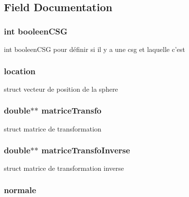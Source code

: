 \subsection{Field Documentation}
\hypertarget{structsphere_a4428e32d4383f7dee25e5a4cb192da24}{
\subsubsection[{booleenCSG}]{\setlength{\rightskip}{0pt plus 5cm}int {\bf booleenCSG}}}
\label{structsphere_a4428e32d4383f7dee25e5a4cb192da24}
int booleenCSG pour définir si il y a une csg et laquelle c'est \hypertarget{structsphere_ae655d799d0a983ee8cf5fc840953c404}{
\subsubsection[{location}]{ {\bf location}}}
\label{structsphere_ae655d799d0a983ee8cf5fc840953c404}
struct vecteur de position de la sphere \hypertarget{structsphere_aa06ccc348007e3355beccf412f2f656c}{
\subsubsection[{matriceTransfo}]{\setlength{\rightskip}{0pt plus 5cm}double$\ast$$\ast$ {\bf matriceTransfo}}}
\label{structsphere_aa06ccc348007e3355beccf412f2f656c}
struct matrice de transformation \hypertarget{structsphere_acd7a3590501dcccfaefccbb658f83821}{
\subsubsection[{matriceTransfoInverse}]{\setlength{\rightskip}{0pt plus 5cm}double$\ast$$\ast$ {\bf matriceTransfoInverse}}}
\label{structsphere_acd7a3590501dcccfaefccbb658f83821}
struct matrice de transformation inverse \hypertarget{structsphere_a944738f40a0294270a0047acc5a77ee2}{
\subsubsection[{normale}]{ {\bf normale}}}

